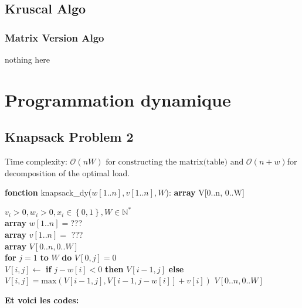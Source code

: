 \documentclass{article}
\theoremstyle{definition}
\theoremstyle{remark}
\begin{document}
    \subsection{Kruscal Algo}
    \subsubsection{Matrix Version Algo}
    nothing here


\section{Programmation dynamique}
\subsection{Knapsack Problem 2}
Time complexity: $\mathcal{O} \left ( nW \right ) \text{ for constructing the matrix(table) and  }\mathcal{O} \left ( n+w \right ) $for decomposition of the optimal load.\\
    \begin{algorithm} 
	\caption{\textbf{fonction} knapsack\_dy($w[1..n],v[1..n],W$): \textbf{array} V[0..n, 0..W]
} 
	\label{alg_sacados2} 
	\begin{algorithmic}
		\REQUIRE $v_{i} > 0, w_{i} > 0, x_{i} \in \left\{ 0,1 \right\}, W \in \mathbb{N}^{*} $ \\
		\textbf{array} $w[1..n] = $??? \\
		\textbf{array} $v[1..n] =$ ???\\ 
		\textbf{array} $V[0..n,0..W]$\\ 
		\textbf{for} $j = 1$ \textbf{to} $W$ \textbf{do} $V\left[ 0,j \right] = 0$\\
		\STATE $V[i,j] \gets$ \textbf{if} $j-w[i]<0 $ \textbf{then} $V[i-1,j]$ 
		\STATE \qquad\qquad\;\textbf{else} $V\left[ i,j \right] = \text{max}\left( V[i-1,j], V[i-1,j-w[i]] + v[i] \right) $
		\ENDFOR
		\ENDFOR
		\RETURN $V[0..n,0..W]$
	\end{algorithmic} 
\end{algorithm}
\textbf{Et voici les codes:}
\end{document}
